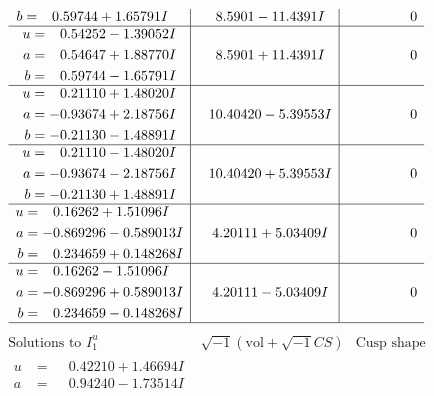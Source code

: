 \documentclass[1p]{elsarticle_modified}
\theoremstyle{definition}
\newcommand{\I}{\sqrt{-1}}
\begin{document}
$$\begin{array}{c|c|c}
\begin{aligned}
b &= \phantom{-}0.59744 + 1.65791 I\end{aligned}
 & \phantom{-}8.5901 - 11.4391 I & \phantom{-0.000000 } 0 \\ \hline\begin{aligned}
u &= \phantom{-}0.54252 - 1.39052 I \\
a &= \phantom{-}0.54647 + 1.88770 I \\
b &= \phantom{-}0.59744 - 1.65791 I\end{aligned}
 & \phantom{-}8.5901 + 11.4391 I & \phantom{-0.000000 } 0 \\ \hline\begin{aligned}
u &= \phantom{-}0.21110 + 1.48020 I \\
a &= -0.93674 + 2.18756 I \\
b &= -0.21130 - 1.48891 I\end{aligned}
 & \phantom{-}10.40420 - 5.39553 I & \phantom{-0.000000 } 0 \\ \hline\begin{aligned}
u &= \phantom{-}0.21110 - 1.48020 I \\
a &= -0.93674 - 2.18756 I \\
b &= -0.21130 + 1.48891 I\end{aligned}
 & \phantom{-}10.40420 + 5.39553 I & \phantom{-0.000000 } 0 \\ \hline\begin{aligned}
u &= \phantom{-}0.16262 + 1.51096 I \\
a &= -0.869296 - 0.589013 I \\
b &= \phantom{-}0.234659 + 0.148268 I\end{aligned}
 & \phantom{-}4.20111 + 5.03409 I & \phantom{-0.000000 } 0 \\ \hline\begin{aligned}
u &= \phantom{-}0.16262 - 1.51096 I \\
a &= -0.869296 + 0.589013 I \\
b &= \phantom{-}0.234659 - 0.148268 I\end{aligned}
 & \phantom{-}4.20111 - 5.03409 I & \phantom{-0.000000 } 0\\
 \hline 
 \end{array}$$\newpage$$\begin{array}{c|c|c}  
\text{Solutions to }I^u_{1}& \I (\text{vol} + \sqrt{-1}CS) & \text{Cusp shape}\\
 \hline 
\begin{aligned}
u &= \phantom{-}0.42210 + 1.46694 I \\
a &= \phantom{-}0.94240 - 1.73514 I \\

\end{aligned}
\end{array}$$
\end{document}
